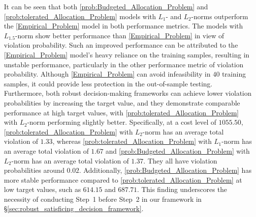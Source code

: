 \documentclass[opre, blindrev]{informs4}
\newcommand{\1}[1]{\mathds{1}{\left(#1\right)}}
\begin{document}
It can be seen that both \ref{prob:Budgeted_Allocation_Problem} and \ref{prob:tolerated_Allocation_Problem} models with $L_1$- and $L_2$-norms outperform the \ref{Empirical_Problem} model in both performance metrics. The models with $L_{1.5}$-norm show better performance than \ref{Empirical_Problem} in view of violation probability. Such an improved performance can be attributed to the \ref{Empirical_Problem} model's heavy reliance on the training samples, resulting in unstable performance, particularly in the other performance metric of violation probability. Although \ref{Empirical_Problem} can avoid infeasibility in $40$ training samples, it could provide less protection in the out-of-sample testing. Furthermore, both robust decision-making frameworks can achieve lower violation probabilities by increasing the target value, and they demonstrate comparable performance at high target values, with \ref{prob:tolerated_Allocation_Problem} with $L_2$-norm performing slightly better. Specifically, at a cost level of $1055.50$,
\ref{prob:tolerated_Allocation_Problem} with $L_2$-norm has an average total violation of $1.33$, whereas \ref{prob:tolerated_Allocation_Problem} with $L_1$-norm has an average total violation of $1.67$ and \ref{prob:Budgeted_Allocation_Problem} with $L_2$-norm has an average total violation of $1.37$. They all have violation probabilities around $0.02$.
Additionally, \ref{prob:Budgeted_Allocation_Problem} has more stable performance compared to \ref{prob:tolerated_Allocation_Problem} at low target values, such as $614.15$ and $687.71$. This finding underscores the necessity of conducting Step~1 before Step~2 in our framework in \S \ref{sec:robust_satisficing_decision_framework}.
\end{document}
